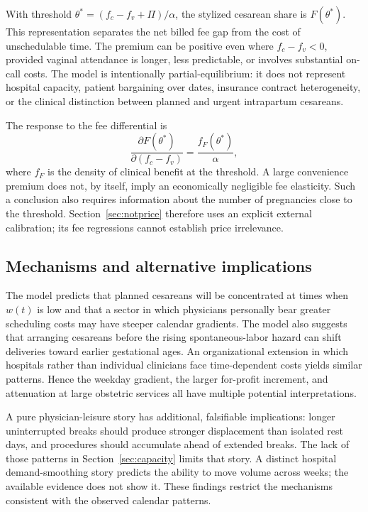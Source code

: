 With threshold $\theta^*=(f_c-f_v+\Pi)/\alpha$, the stylized cesarean share is $F(\theta^*)$. This representation separates the net billed fee gap from the cost of unschedulable time. The premium can be positive even where $f_c-f_v<0$, provided vaginal attendance is longer, less predictable, or involves substantial on-call costs. The model is intentionally partial-equilibrium: it does not represent hospital capacity, patient bargaining over dates, insurance contract heterogeneity, or the clinical distinction between planned and urgent intrapartum cesareans.

The response to the fee differential is
\begin{equation}
\frac{\partial F(\theta^*)}{\partial(f_c-f_v)}=\frac{f_F(\theta^*)}{\alpha},
\label{eq:feeresponse}
\end{equation}
where $f_F$ is the density of clinical benefit at the threshold. A large convenience premium does not, by itself, imply an economically negligible fee elasticity. Such a conclusion also requires information about the number of pregnancies close to the threshold. Section~\ref{sec:notprice} therefore uses an explicit external calibration; its fee regressions cannot establish price irrelevance.

\subsection{Mechanisms and alternative implications}

The model predicts that planned cesareans will be concentrated at times when $w(t)$ is low and that a sector in which physicians personally bear greater scheduling costs may have steeper calendar gradients. The model also suggests that arranging cesareans before the rising spontaneous-labor hazard can shift deliveries toward earlier gestational ages. An organizational extension in which hospitals rather than individual clinicians face time-dependent costs yields similar patterns. Hence the weekday gradient, the larger for-profit increment, and attenuation at large obstetric services all have multiple potential interpretations.

A pure physician-leisure story has additional, falsifiable implications: longer uninterrupted breaks should produce stronger displacement than isolated rest days, and procedures should accumulate ahead of extended breaks. The lack of those patterns in Section~\ref{sec:capacity} limits that story. A distinct hospital demand-smoothing story predicts the ability to move volume across weeks; the available evidence does not show it. These findings restrict the mechanisms consistent with the observed calendar patterns.

